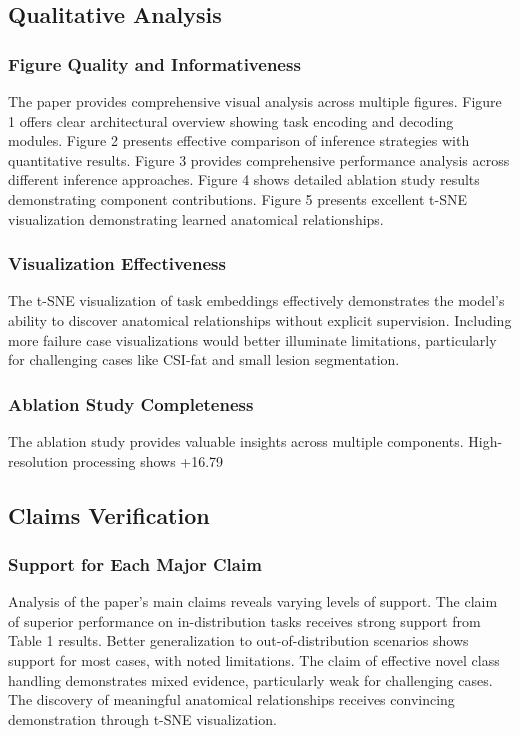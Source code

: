\subsection{Qualitative Analysis}
\subsubsection{Figure Quality and Informativeness}
The paper provides comprehensive visual analysis across multiple figures. Figure 1 offers clear architectural overview showing task encoding and decoding modules. Figure 2 presents effective comparison of inference strategies with quantitative results. Figure 3 provides comprehensive performance analysis across different inference approaches. Figure 4 shows detailed ablation study results demonstrating component contributions. Figure 5 presents excellent t-SNE visualization demonstrating learned anatomical relationships.

\subsubsection{Visualization Effectiveness}
The t-SNE visualization of task embeddings effectively demonstrates the model's ability to discover anatomical relationships without explicit supervision. Including more failure case visualizations would better illuminate limitations, particularly for challenging cases like CSI-fat and small lesion segmentation.

\subsubsection{Ablation Study Completeness}
The ablation study provides valuable insights across multiple components. High-resolution processing shows +16.79%

\subsection{Claims Verification}
\subsubsection{Support for Each Major Claim}
Analysis of the paper's main claims reveals varying levels of support. The claim of superior performance on in-distribution tasks receives strong support from Table 1 results. Better generalization to out-of-distribution scenarios shows support for most cases, with noted limitations. The claim of effective novel class handling demonstrates mixed evidence, particularly weak for challenging cases. The discovery of meaningful anatomical relationships receives convincing demonstration through t-SNE visualization.

